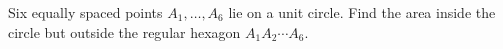 Six equally spaced points $A_1,\ldots,A_6$ lie on a unit circle. Find the area inside the circle but outside the regular hexagon $A_1A_2\cdots A_6$.
